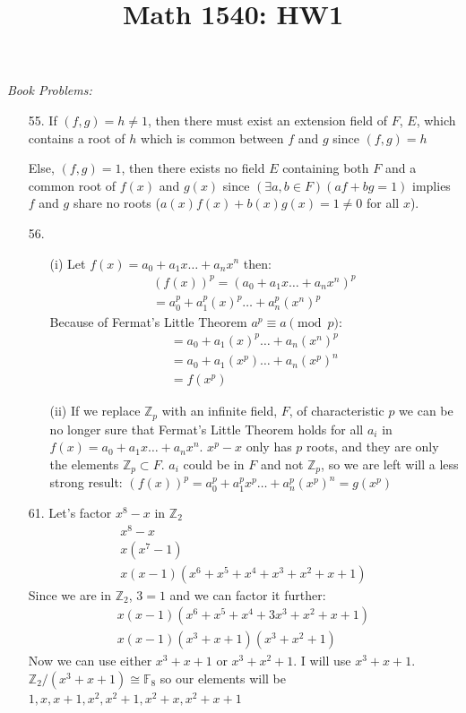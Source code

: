 \documentclass{article}
\title{Math 1540: HW1}
\begin{document}
\maketitle
\emph{Book Problems:}
\begin{enumerate}
    \item[55.]
    If \((f,g) = h \neq 1\), then there must exist an extension field of \(F\), \(E\), which contains a root of \(h\) which is common between \(f\) and \(g\) since \((f,g) = h\)

    Else, \((f,g) = 1\), then there exists no field \(E\) containing both \(F\) and a common root of \(f(x)\) and \(g(x)\) since \((\exists a, b \in F)(af + bg = 1)\) implies \(f\) and \(g\) share no roots (\(a(x)f(x)+ b(x)g(x) = 1 \neq 0\) for all \(x\)).   

    \item[56.] 
    \begin{enumerate}
    \item[(i)]
    Let \(f(x) = a_0 + a_1 x \ldots + a_n x^n \) then:
    \begin{eqnarray*}
        (f(x))^p = (a_0 + a_1 x \ldots + a_n x^n)^p \\
        = a_0^p + a_1^p (x)^p \ldots + a_n^p (x^n)^p 
    \end{eqnarray*}
    Because of Fermat's Little Theorem \(a^p \equiv a \pmod p\):
    \begin{eqnarray*}
        = a_0 + a_1 (x)^p \ldots + a_n (x^n)^p \\
        = a_0 + a_1 (x^p) \ldots + a_n (x^p)^n \\
        = f(x^p) 
    \end{eqnarray*}
    
    \item[(ii)] If we replace \(\mathbb{Z}_p\) with an infinite field, \(F\), of characteristic \(p\) we can be no longer sure that Fermat's Little Theorem holds for all \(a_i\) in \(f(x) = a_0 + a_1 x \ldots + a_n x^n \). \(x^p - x\) only has \(p\) roots, and they are only the elements \(\mathbb{Z}_p \subset F\). \(a_i\) could be in \(F\) and not \(\mathbb{Z}_p\), so we are left will a less strong result: \((f(x))^p = a_0^p + a_1^p x^p \ldots + a_n^p (x^p)^n = g(x^p)\)  
    \end{enumerate}
    \item[61.] Let's factor \(x^8 - x\) in \(\mathbb{Z}_2\) 
    \begin{eqnarray*}
        x^8 - x \\
        x(x^7 - 1) \\
        x(x-1)(x^6 + x^5 + x^4 + x^3 + x^2 + x + 1)
    \end{eqnarray*}
    Since we are in \(\mathbb{Z}_2\), \(3 = 1\) and we can factor it further:  
    \begin{eqnarray*}
        x(x-1)(x^6 + x^5 + x^4 + 3x^3 + x^2 + x + 1) \\
        x(x-1)(x^3+x+1)(x^3+x^2+1)  
    \end{eqnarray*}
    Now we can use either \(x^3+x+1\) or \(x^3+x^2+1\). I will use \(x^3+x+1\).
    \(\mathbb{Z}_2/(x^3+x+1) \cong \mathbb{F}_8\) so our elements will be \(1, x, x + 1, x^2, x^2 + 1, x^2 + x, x^2 + x + 1\)
    

\end{enumerate}
\end{document}
